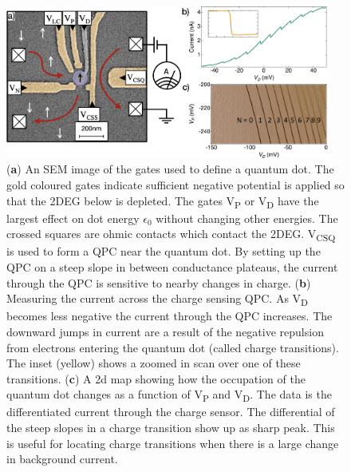 \begin{figure}[!htb]
 \begin{center}
  \includegraphics[width=0.95\textwidth]{figures/ch1/crop_FiguresMaster.006.png}
  \caption[Charge sensing a quantum dot]{\label{fig:ch1/ct_intro} 
  (\textbf{a}) An SEM image of the gates used to define a quantum dot. The gold coloured gates indicate sufficient negative potential is applied so that the 2DEG below is depleted. The gates V\textsubscript{P} or V\textsubscript{D} have the largest effect on dot energy $\epsilon_0$ without changing other energies. The crossed squares are ohmic contacts which contact the 2DEG. V\textsubscript{CSQ} is used to form a QPC near the quantum dot. By setting up the QPC on a steep slope in between conductance plateaus, the current through the QPC is sensitive to nearby changes in charge. (\textbf{b}) Measuring the current across the charge sensing QPC. As V\textsubscript{D} becomes less negative the current through the QPC increases. The downward jumps in current are a result of the negative repulsion from electrons entering the quantum dot (called charge transitions). The inset (yellow) shows a zoomed in scan over one of these transitions. (\textbf{c}) A 2d map showing how the occupation of the quantum dot changes as a function of V\textsubscript{P} and V\textsubscript{D}. The data is the differentiated current through the charge sensor. The differential of the steep slopes in a charge transition show up as sharp peak. This is useful for locating charge transitions when there is a large change in background current. 
   }
 \end{center}
\end{figure}


